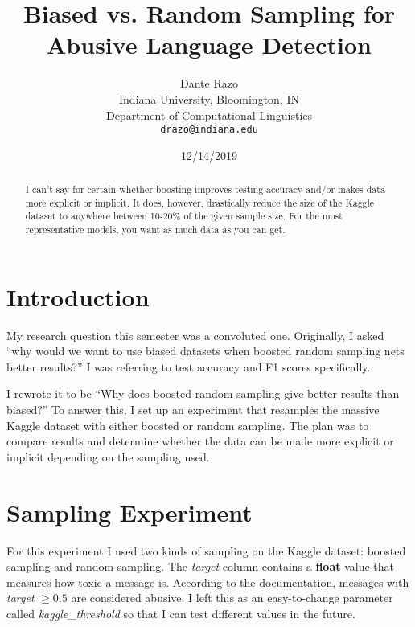 \documentclass[11pt,a4paper]{article}
\title{Biased vs. Random Sampling for Abusive Language Detection}
\author{Dante Razo \\
	Indiana University, Bloomington, IN \\
	Department of Computational Linguistics \\
	{\tt drazo@indiana.edu} \\}
\date{12/14/2019}
\begin{document}
\maketitle


\begin{abstract}
I can't say for certain whether boosting improves testing accuracy and/or makes data more explicit or implicit. It does, however, drastically reduce the size of the Kaggle dataset to anywhere between 10-20\% of the given sample size. For the most representative models, you want as much data as you can get.
\end{abstract}

\section{Introduction} %
My research question this semester was a convoluted one. Originally, I asked ``why would we want to use biased datasets when boosted random sampling nets better results?'' I was referring to test accuracy and F1 scores specifically.

I rewrote it to be ``Why does boosted random sampling give better results than biased?'' To answer this, I set up an experiment that resamples the massive Kaggle dataset with either boosted or random sampling. The plan was to compare results and determine whether the data can be made more explicit or implicit depending on the sampling used.

\section{Sampling Experiment}
For this experiment I used two kinds of sampling on the Kaggle dataset: boosted sampling and random sampling. The \textit{target} column contains a \textbf{float} value that measures how toxic a message is. According to the documentation, messages with \textit{target} $\geq 0.5$ are considered abusive. I left this as an easy-to-change parameter called \textit{kaggle\_threshold} so that I can test different values in the future.
\end{document}
